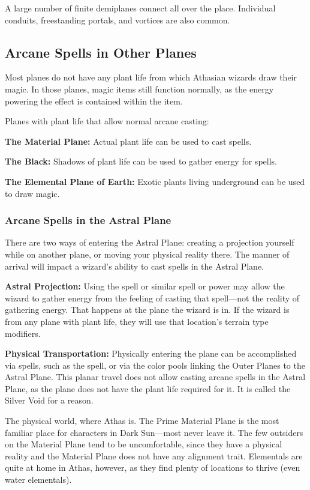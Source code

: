 A large number of finite demiplanes connect all over the place. Individual conduits, freestanding portals, and vortices are also common.

\subsection{Arcane Spells in Other Planes}
Most planes do not have any plant life from which Athasian wizards draw their magic. In those planes, magic items still function normally, as the energy powering the effect is contained within the item.

Planes with plant life that allow normal arcane casting:
\begin{itemize*}
\item \textbf{The Material Plane:} Actual plant life can be used to cast spells.
\item \textbf{The Black:} Shadows of plant life can be used to gather energy for spells.
\item \textbf{The Elemental Plane of Earth:} Exotic plants living underground can be used to draw magic.
\end{itemize*}

\subsubsection{Arcane Spells in the Astral Plane}
There are two ways of entering the Astral Plane: creating a projection yourself while on another plane, or moving your physical reality there. The manner of arrival will impact a wizard's ability to cast spells in the Astral Plane.

\textbf{Astral Projection:} Using the  spell or similar spell or power may allow the wizard to gather energy from the feeling of casting that spell---not the reality of gathering energy. That happens at the plane the wizard is in. If the wizard is  from any plane with plant life, they will use that location's terrain type modifiers.

\textbf{Physical Transportation:} Physically entering the plane can be accomplished via spells, such as the  spell, or via the color pools linking the Outer Planes to the Astral Plane. This planar travel does not allow casting arcane spells in the Astral Plane, as the plane does not have the plant life required for it. It is called the Silver Void for a reason.


The physical world, where Athas is. The Prime Material Plane is the most familiar place for characters in {\tableheader Dark Sun}---most never leave it. The few outsiders on the Material Plane tend to be uncomfortable, since they have a physical reality and the Material Plane does not have any alignment trait. Elementals are quite at home in Athas, however, as they find plenty of locations to thrive (even water elementals).

